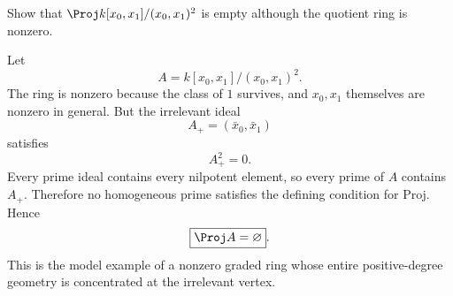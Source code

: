 \begin{problem}\label{prob:vi37-08}
Show that \(\Proj k[x_0,x_1]/(x_0,x_1)^2\) is empty although the quotient ring is nonzero.
\end{problem}

\ifdefined\FullProblemDossiers
\begin{solution}
Let
\[
A=k[x_0,x_1]/(x_0,x_1)^2.
\]
The ring is nonzero because the class of \(1\) survives, and \(x_0,x_1\) themselves are nonzero in general. But the irrelevant ideal
\[
A_+=(\bar x_0,\bar x_1)
\]
satisfies
\[
A_+^2=0.
\]
Every prime ideal contains every nilpotent element, so every prime of \(A\) contains \(A_+\). Therefore no homogeneous prime satisfies the defining condition for Proj. Hence
\[
\boxed{\Proj A=\varnothing}.
\]
This is the model example of a nonzero graded ring whose entire positive-degree geometry is concentrated at the irrelevant vertex.
\end{solution}
\fi
